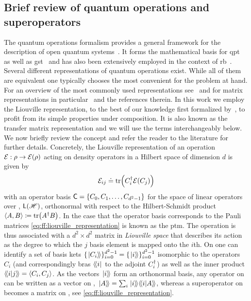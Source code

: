 \subsection{Brief review of quantum operations and superoperators}\label{subsec:ff:theory:quantum_operations}
The quantum operations formalism provides a general framework for the description of open quantum systems~\cite{Kraus1983,Nielsen2011}.
It forms the mathematical basis for \gls{qpt}~\cite{Chuang1997,Poyatos1997} as well as \gls{gst}~\cite{Blume-Kohout2013,Greenbaum2015} and has also been extensively employed in the context of \gls{rb}~\cite{Magesan2011,Kimmel2014}.
Several different representations of quantum operations exist.
While all of them are equivalent one typically chooses the most convenient for the problem at hand.
For an overview of the most commonly used representations see~ and for matrix representations in particular~ and the references therein.
In this work we employ the Liouville representation, to the best of our knowledge first formalized by~\citet{Fano1957}, to profit from its simple properties under composition.
It is also known as the transfer matrix representation and we will use the terms interchangeably below.
We now briefly review the concept and refer the reader to the literature for further details.
Concretely, the Liouville representation of an operation $\mathcal{E}: \rho\rightarrow\mathcal{E}(\rho)$ acting on density operators in a Hilbert space \Hspace of dimension $d$ is given by
\begin{equation}\label{eq:ff:liouville_representation}
\mathcal{E}_{ij}\doteq\tr(C_i^\dagger\mathcal{E}(C_j))
\end{equation}
with an operator basis $\mathsf{C}=\lbrace C_0, C_1, \dotsc, C_{d^2-1}\rbrace$ for the space of linear operators over \Hspace, $\mathsf{L}(\mathscr{H})$, orthonormal with respect to the Hilbert-Schmidt product $\expval{A,B}\coloneqq\tr(A^\dagger B)$.
In the case that the operator basis corresponds to the Pauli matrices \cref{eq:ff:liouville_representation} is known as the \gls{ptm}.
The operation \qp is thus associated with a $d^2\times d^2$ matrix in \emph{Liouville space} \Lspace that describes its action as the degree to which the $j$ basis element is mapped onto the $i$th.
On \Lspace one can identify a set of basis kets $\lbrace\mbox{\ensuremath{\left.\ket{C_i}\!\right\rangle}}\rbrace_{i=0}^{d^2-1} = \lbrace\mbox{\ensuremath{\left.\ket{i}\!\right\rangle}}\rbrace_{i=0}^{d^2-1}$ isomorphic to the operators $C_i$ (and correspondingly bras $\mbox{\ensuremath{\left\langle\!\bra{i}\right.}}$ to the adjoint $C_i^\dagger$) as well as the inner product $\mbox{\ensuremath{\left\langle\!\braket{i}{j}\!\right\rangle}} = \expval{C_i,C_j}$.
As the vectors $\mbox{\ensuremath{\left.\ket{i}\!\right\rangle}}$ form an orthonormal basis, any operator on \Hspace can be written as a vector on \Lspace, $\mbox{\ensuremath{\left.\ket{A}\!\right\rangle}} = \sum_i\mbox{\ensuremath{\left.\ket{i}\!\right\rangle}}\mbox{\ensuremath{\left\langle\!\braket{i}{A}\!\right\rangle}}$, whereas a superoperator on \Hspace becomes a matrix on \Lspace, see \cref{eq:ff:liouville_representation}.
